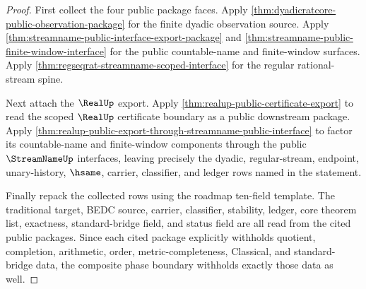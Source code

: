 \begin{proof}
First collect the four public package faces. Apply
\autoref{thm:dyadicratcore-public-observation-package} for the finite dyadic
observation source. Apply
\autoref{thm:streamname-public-interface-export-package} and
\autoref{thm:streamname-public-finite-window-interface} for the public
countable-name and finite-window surfaces. Apply
\autoref{thm:regseqrat-streamname-scoped-interface} for the regular
rational-stream spine.

Next attach the $\RealUp$ export. Apply
\autoref{thm:realup-public-certificate-export} to read the scoped $\RealUp$
certificate boundary as a public downstream package. Apply
\autoref{thm:realup-public-export-through-streamname-public-interface} to
factor its countable-name and finite-window components through the public
$\StreamNameUp$ interfaces, leaving precisely the dyadic, regular-stream,
endpoint, unary-history, $\hsame$, carrier, classifier, and ledger rows named
in the statement.

Finally repack the collected rows using the roadmap ten-field template. The
traditional target, BEDC source, carrier, classifier, stability, ledger, core
theorem list, exactness, standard-bridge field, and status field are all read
from the cited public packages. Since each cited package explicitly withholds
quotient, completion, arithmetic, order, metric-completeness, Classical, and
standard-bridge data, the composite phase boundary withholds exactly those data
as well.
\end{proof}

